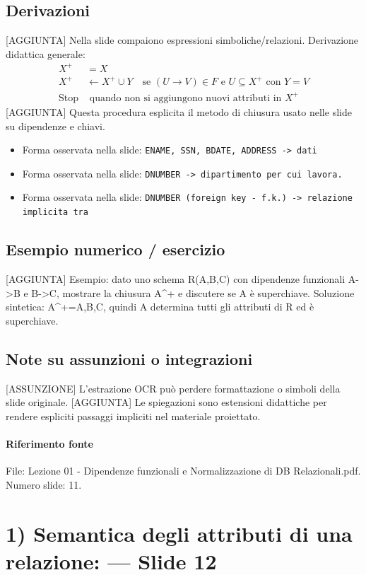 \documentclass[11pt]{article}
\begin{document}
\subsection*{Derivazioni}
[AGGIUNTA] Nella slide compaiono espressioni simboliche/relazioni. Derivazione didattica generale:
\begin{align*}
X^+ &= X \\
X^+ &\leftarrow X^+ \cup Y \quad \text{se } (U \to V) \in F \text{ e } U \subseteq X^+ \text{ con } Y=V \\
\text{Stop} &\text{ quando non si aggiungono nuovi attributi in } X^+
\end{align*}
[AGGIUNTA] Questa procedura esplicita il metodo di chiusura usato nelle slide su dipendenze e chiavi.
\begin{itemize}[leftmargin=*]
\item Forma osservata nella slide: \texttt{ENAME, SSN, BDATE, ADDRESS -> dati}
\item Forma osservata nella slide: \texttt{DNUMBER -> dipartimento per cui lavora.}
\item Forma osservata nella slide: \texttt{DNUMBER (foreign key - f.k.) -> relazione implicita tra}
\end{itemize}
\subsection*{Esempio numerico / esercizio}
[AGGIUNTA] Esempio: dato uno schema R(A,B,C) con dipendenze funzionali A->B e B->C, mostrare la chiusura A^+ e discutere se A è superchiave. Soluzione sintetica: A^+={A,B,C}, quindi A determina tutti gli attributi di R ed è superchiave.
\subsection*{Note su assunzioni o integrazioni}
[ASSUNZIONE] L'estrazione OCR può perdere formattazione o simboli della slide originale.
[AGGIUNTA] Le spiegazioni sono estensioni didattiche per rendere espliciti passaggi impliciti nel materiale proiettato.
\paragraph{Riferimento fonte} File: Lezione 01 - Dipendenze funzionali e Normalizzazione di DB Relazionali.pdf. Numero slide: 11.
\section{1) Semantica degli attributi di una relazione: --- Slide 12}
\end{document}
